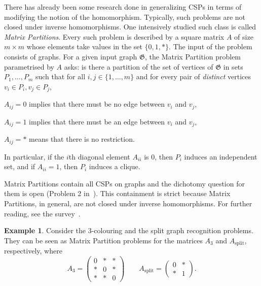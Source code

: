 \documentclass[10pt,a4paper]{amsart}
\theoremstyle{plain}
\theoremstyle{definition}
\newtheorem{exa}[thm]{Example}
\numberwithin{equation}{section}
\newcommand{\structure}[1]{\mathfrak{#1}} %
\begin{document}
There has already been some research done in generalizing CSPs in terms of modifying the notion of the homomorphism.
%
Typically, such problems are not closed under inverse homomorphisms.
%
One intensively studied such class is called \emph{Matrix Partitions}.
%
Every such problem is described by a square matrix $A$ of size $m\times m$ whose elements take values in the set $\{0,1,\ast\}$.
%
The input of the problem consists of graphs.
%
For a given input graph $\structure{G}$, the Matrix Partition problem parametrised by $A$ asks: is there a partition of the set of vertices of $\structure{G}$ in sets $P_1,\ldots,P_m$ such that for all $i,j\in\{1,\ldots,m\}$ and for every pair of \emph{distinct} vertices $v_i\in P_i,v_j\in P_j$,
\begin{compactitem}
\item $A_{ij}=0$ implies that there must be no edge between $v_i$ and $v_j$,
\item $A_{ij}=1$ implies that there must be an edge between $v_i$ and $v_j$,
\item $A_{ij}=\ast$ means that there is no restriction.
\end{compactitem}
In particular, if the $i$th diagonal element $A_{ii}$ is $0$, then $P_i$ induces an independent set, and if $A_{ii}=1$, then $P_i$ induces a clique.

Matrix Partitions contain all CSPs on graphs and the dichotomy question for them is open (Problem 2 in~\cite{hell2014}).
%
This containment is strict because Matrix Partitions, in general, are not closed under inverse homomorphisms.
%
For further reading, see the survey~\cite{hell2014}.
\begin{exa}
Consider the 3-colouring and the split graph recognition problems.
%
They can be seen as Matrix Partition problems for the matrices $A_3$ and $A_{\mathrm{split}}$, respectively, where
\begin{equation*}
A_3 = \begin{pmatrix}0 & \ast & \ast\\ \ast & 0 & \ast\\ \ast & \ast & 0\end{pmatrix}\qquad A_{\mathrm{split}} = \begin{pmatrix}0 & \ast\\ \ast & 1\end{pmatrix}.
\end{equation*}
\end{exa}
\end{document}

